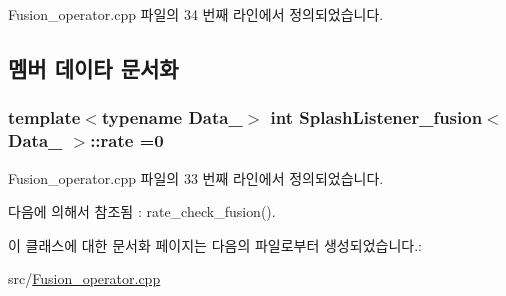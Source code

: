 Fusion\+\_\+operator.\+cpp 파일의 34 번째 라인에서 정의되었습니다.



\subsection{멤버 데이타 문서화}
\subsubsection[{\texorpdfstring{rate}{rate}}]{\setlength{\rightskip}{0pt plus 5cm}template$<$typename Data\+\_$>$ int {\bf Splash\+Listener\+\_\+fusion}$<$ Data\+\_ $>$\+::rate =0}\hypertarget{classSplashListener__fusion_ae17c2d81f1c7e0aebe7f5c2daf59961e}{}\label{classSplashListener__fusion_ae17c2d81f1c7e0aebe7f5c2daf59961e}


Fusion\+\_\+operator.\+cpp 파일의 33 번째 라인에서 정의되었습니다.



다음에 의해서 참조됨 \+:  rate\+\_\+check\+\_\+fusion().



이 클래스에 대한 문서화 페이지는 다음의 파일로부터 생성되었습니다.\+:\begin{DoxyCompactItemize}
\item 
src/\hyperlink{Fusion__operator_8cpp}{Fusion\+\_\+operator.\+cpp}\end{DoxyCompactItemize}
